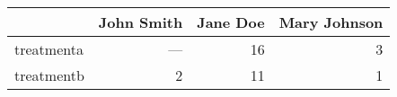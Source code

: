 \begin{tabular}{lrrr}
  \toprule
  & John Smith & Jane Doe & Mary Johnson \\ 
  \midrule
  treatmenta & --- &  16 &   3 \\ 
  treatmentb &   2 &  11 &   1 \\ 
   \bottomrule
\end{tabular}
